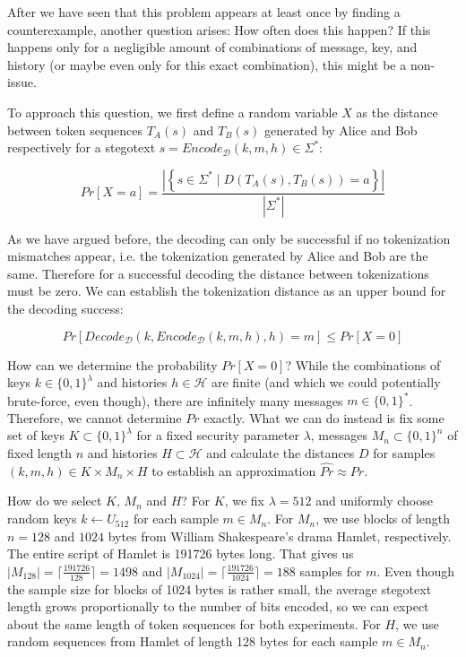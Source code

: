 After we have seen that this problem appears at least once by finding a counterexample, another question arises:
How often does this happen?
If this happens only for a negligible amount of combinations of message, key, and history (or maybe even only for this exact combination), this might be a non-issue.

To approach this question, we first define a random variable $X$ as the distance between token sequences $T_A(s)$ and $T_B(s)$ generated by Alice and Bob respectively for a stegotext $s = Encode_{\mathcal{D}}(k,m,h) \in \Sigma^*$:

$$Pr[X=a] = \frac{\left| \left\{ s \in \Sigma^* \mid D(T_A(s), T_B(s)) = a \right\} \right|}{\left| \Sigma^* \right|}$$

As we have argued before, the decoding can only be successful if no tokenization mismatches appear, i.e. the tokenization generated by Alice and Bob are the same.
Therefore for a successful decoding the distance between tokenizations must be zero.
We can establish the tokenization distance as an upper bound for the decoding success:

$$Pr[Decode_{\mathcal{D}}(k, Encode_{\mathcal{D}}(k,m,h), h)=m] \leq Pr[X=0]$$

How can we determine the probability $Pr[X=0]$?
While the combinations of keys $k \in \{0,1\}^\lambda$ and histories $h \in \mathcal{H}$ are finite (and which we could potentially brute-force, even though), there are infinitely many messages $m \in \{0,1\}^*$.
Therefore, we cannot determine $Pr$ exactly.
What we can do instead is fix some set of keys $K \subset \{0,1\}^\lambda$ for a fixed security parameter $\lambda$, messages $M_n \subset \{0,1\}^n$ of fixed length $n$ and histories $H \subset \mathcal{H}$ and calculate the distances $D$ for samples $(k,m,h) \in K \times M_n \times H$ to establish an approximation $\hat{Pr} \approx Pr$.

How do we select $K$, $M_n$ and $H$?
For $K$, we fix $\lambda = 512$ and uniformly choose random keys $k \leftarrow U_{512}$ for each sample $m \in M_n$.
For $M_n$, we use blocks of length $n=128$ and $1024$ bytes from William Shakespeare's drama Hamlet, respectively.
The entire script of Hamlet is 191726 bytes long.
That gives us $|M_{128}|=\lceil \frac{191726}{128} \rceil = 1498$ and $|M_{1024}|= \lceil \frac{191726}{1024} \rceil = 188$ samples for $m$.
Even though the sample size for blocks of 1024 bytes is rather small, the average stegotext length grows proportionally to the number of bits encoded, so we can expect about the same length of token sequences for both experiments.
For $H$, we use random sequences from Hamlet of length 128 bytes for each sample $m \in M_n$.

